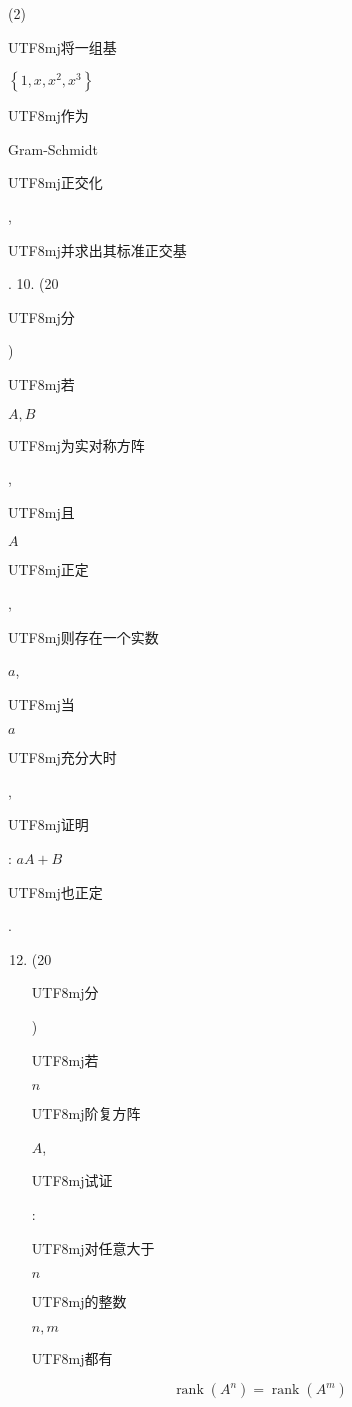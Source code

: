 \documentclass[10pt]{article}
\begin{document}
(2) \begin{CJK}{UTF8}{mj}将一组基\end{CJK} $\left\{1, x, x^{2}, x^{3}\right\}$ \begin{CJK}{UTF8}{mj}作为\end{CJK} Gram-Schmidt \begin{CJK}{UTF8}{mj}正交化\end{CJK}, \begin{CJK}{UTF8}{mj}并求出其标准正交基\end{CJK}. 10. (20 \begin{CJK}{UTF8}{mj}分\end{CJK}) \begin{CJK}{UTF8}{mj}若\end{CJK} $A, B$ \begin{CJK}{UTF8}{mj}为实对称方阵\end{CJK}, \begin{CJK}{UTF8}{mj}且\end{CJK} $A$ \begin{CJK}{UTF8}{mj}正定\end{CJK}, \begin{CJK}{UTF8}{mj}则存在一个实数\end{CJK} $a$, \begin{CJK}{UTF8}{mj}当\end{CJK} $a$ \begin{CJK}{UTF8}{mj}充分大时\end{CJK}, \begin{CJK}{UTF8}{mj}证明\end{CJK}: $a A+B$ \begin{CJK}{UTF8}{mj}也正定\end{CJK}.

\begin{enumerate}
  \setcounter{enumi}{11}
  \item (20 \begin{CJK}{UTF8}{mj}分\end{CJK}) \begin{CJK}{UTF8}{mj}若\end{CJK} $n$ \begin{CJK}{UTF8}{mj}阶复方阵\end{CJK} $A$, \begin{CJK}{UTF8}{mj}试证\end{CJK}: \begin{CJK}{UTF8}{mj}对任意大于\end{CJK} $n$ \begin{CJK}{UTF8}{mj}的整数\end{CJK} $n, m$ \begin{CJK}{UTF8}{mj}都有\end{CJK}
\end{enumerate}
$$
\operatorname{rank}\left(A^{n}\right)=\operatorname{rank}\left(A^{m}\right)
$$
\end{document}
